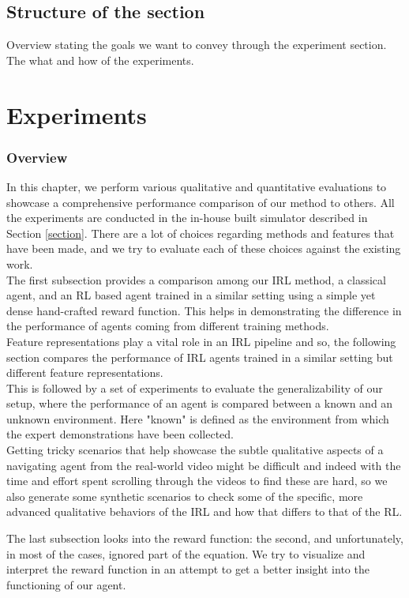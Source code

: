 \subsection{Structure of the section}
Overview stating the goals we want to convey through the experiment section. The what and how of the experiments.
\section*{Experiments}
\subsubsection*{Overview}
In this chapter, we perform various qualitative and quantitative evaluations to showcase a comprehensive performance comparison of our method to others. All the experiments are conducted in the in-house built simulator described in Section \ref{section}. There are a lot of choices regarding methods and features that have been made, and we try to evaluate each of these choices against the existing work.\\
The first subsection provides a comparison among our IRL method, a classical agent, and an RL based agent trained in a similar setting using a simple yet dense hand-crafted reward function. This helps in demonstrating the difference in the performance of agents coming from different training methods.\\
 Feature representations play a vital role in an IRL pipeline and so, the following section compares the performance of IRL agents trained in a similar setting but different feature representations.\\
This is followed by a set of experiments to evaluate the generalizability of our setup, where the performance of an agent is compared between a known and an unknown environment. Here "known" is defined as the environment from which the expert demonstrations have been collected.\\

Getting tricky scenarios that help showcase the subtle qualitative aspects of a navigating agent from the real-world video might be difficult and indeed with the time and effort spent scrolling through the videos to find these are hard, so we also generate some synthetic scenarios to check some of the specific, more advanced qualitative behaviors of the IRL and how that differs to that of the RL.

The last subsection looks into the reward function: the second, and unfortunately, in most of the cases, ignored part of the equation. We try to visualize and interpret the reward function in an attempt to get a better insight into the functioning of our agent.

